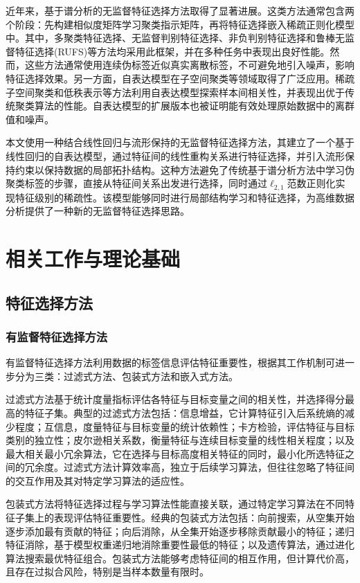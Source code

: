 \documentclass[12pt,a4paper,UTF8]{article}
\begin{document}
  近年来，基于谱分析的无监督特征选择方法取得了显著进展。这类方法通常包含两个阶段：先构建相似度矩阵学习聚类指示矩阵，再将特征选择嵌入稀疏正则化模型中。其中，多聚类特征选择、无监督判别特征选择、非负判别特征选择和鲁棒无监督特征选择(RUFS)等方法均采用此框架，并在多种任务中表现出良好性能。然而，这些方法通常使用连续伪标签近似真实离散标签，不可避免地引入噪声，影响特征选择效果。另一方面，自表达模型在子空间聚类等领域取得了广泛应用。稀疏子空间聚类和低秩表示等方法利用自表达模型探索样本间相关性，并表现出优于传统聚类算法的性能。自表达模型的扩展版本也被证明能有效处理原始数据中的离群值和噪声。
  
  本文使用一种结合线性回归与流形保持的无监督特征选择方法，其建立了一个基于线性回归的自表达模型，通过特征间的线性重构关系进行特征选择，并引入流形保持约束以保持数据的局部拓扑结构。这种方法避免了传统基于谱分析方法中学习伪聚类标签的步骤，直接从特征间关系出发进行选择，同时通过$\ell_{2,1}$范数正则化实现特征级别的稀疏性。该模型能够同时进行局部结构学习和特征选择，为高维数据分析提供了一种新的无监督特征选择思路。

  \section{相关工作与理论基础}
  \subsection{特征选择方法}
  \subsubsection{有监督特征选择方法}
  有监督特征选择方法利用数据的标签信息评估特征重要性，根据其工作机制可进一步分为三类：过滤式方法、包装式方法和嵌入式方法。
  
  过滤式方法基于统计度量指标评估各特征与目标变量之间的相关性，并选择得分最高的特征子集。典型的过滤式方法包括：信息增益，它计算特征引入后系统熵的减少程度；互信息，度量特征与目标变量的统计依赖性；卡方检验，评估特征与目标类别的独立性；皮尔逊相关系数，衡量特征与连续目标变量的线性相关程度；以及最大相关最小冗余算法，它在选择与目标高度相关特征的同时，最小化所选特征之间的冗余度。过滤式方法计算效率高，独立于后续学习算法，但往往忽略了特征间的交互作用及其对特定学习算法的适应性。
  
  包装式方法将特征选择过程与学习算法性能直接关联，通过特定学习算法在不同特征子集上的表现评估特征重要性。经典的包装式方法包括：向前搜索，从空集开始逐步添加最有贡献的特征；向后消除，从全集开始逐步移除贡献最小的特征；递归特征消除，基于模型权重递归地消除重要性最低的特征；以及遗传算法，通过进化算法搜索最优特征组合。包装式方法能够考虑特征间的相互作用，但计算代价高，且存在过拟合风险，特别是当样本数量有限时。
  
\end{document}
